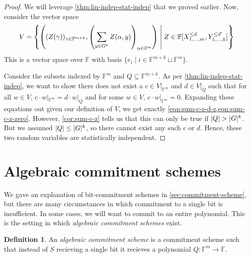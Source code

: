 \documentclass[english,12pt]{reedthesis}
\theoremstyle{plain}
\theoremstyle{definition}
\newtheorem{defn}[defn]{Definition}
\theoremstyle{remark}
\DeclarePairedDelimiter{\abs}{\lvert}{\rvert}
\newcommand{\middlemid}{%
  \ensuremath{\;\middle\vert\;}
}
\begin{document}
\begin{proof}
  We will leverage \cref{thm:lin-indep-stat-indep} that we proved earlier. Now,
  consider the vector space
  \begin{equation}
    V = \mleft\{
      \mleft(
        (Z(\gamma))_{\gamma \in \mathbb{F}^{m+k}}, \mleft(\sum_{y \in G^{k}}Z(\alpha, y)\mright)_{\alpha \in \mathbb{F}^{m}}
      \mright)
      \middlemid
      Z \in \mathbb{F}[X_{1, \ldots, m}^{\le d}, Y_{1, \ldots, k}^{\le d'}]
    \mright\}
  \end{equation}
  This is a vector space over $\mathbb{F}$ with basis
  $\{e_{i} \mid i \in \mathbb{F}^{m+k} \sqcup \mathbb{F}^{m}\}$.

  Consider the subsets indexed by $\mathbb{F}^{m}$ and $Q \subseteq \mathbb{F}^{m+k}$.
  As per \cref{thm:lin-indep-stat-indep}, we want to show there does not exist a
  $c \in V|_{\mathbb{F}^{m}}$ and $d \in V|_{Q}$ such that for all $w \in V$,
  $c \cdot w|_{\mathbb{F}^{m}} = d \cdot w|_{Q}$ and for some $w \in V$,
  $c \cdot w|_{\mathbb{F}^{m}} = 0$. Expanding these equations out given our
  definition of $V$, we get exactly \cref{eqn:sum-c-z-d-z,eqn:sum-c-z-zero}.
  However, \cref{cor:sum-c-z} tells us that this can only be true if
  $\abs{Q} > \abs{G}^{k}$. But we assumed $\abs{Q} \le \abs{G}^{k}$, so there
  cannot exist any such $c$ or $d$. Hence, these two random variables are
  statistically independent.
\end{proof}


\section{Algebraic commitment schemes}\label{sec:alg-commit-scheme}

We gave an explanation of bit-commitment schemes in
\cref{sec:commitment-scheme}, but there are many circumstances in which
commitment to a single bit is insufficient. In some cases, we will want to
commit to an entire polynomial. This is the setting in which \emph{algebraic
  commitment schemes} exist.

\begin{defn}\label{def:alg-comm-scheme}
  An \emph{algebraic commitment scheme} is a commitment scheme such that instead
  of $S$ recieving a single bit it recieves a polynomial
  $Q\colon \mathbb{F}^{m} \rightarrow \mathbb{F}$.
\end{defn}
\end{document}
